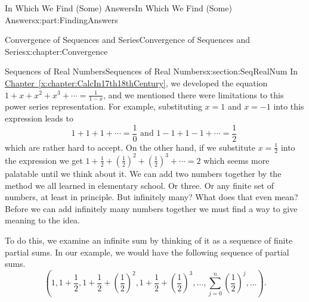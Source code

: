 \typeout{************************************************}
\typeout{************************************************}
%
\begin{partptx}{In Which We Find (Some) Answers}{}{In Which We Find (Some) Answers}{}{}{x:part:FindingAnswers}
	\typeout{************************************************}
	\typeout{************************************************}
	\begin{chapterptx}{Convergence of Sequences and Series}{}{Convergence of Sequences and Series}{}{}{x:chapter:Convergence}
		\typeout{************************************************}
		\typeout{************************************************}
		\begin{sectionptx}{Sequences of Real Numbers}{}{Sequences of Real Numbers}{}{}{x:section:SeqRealNum}
			In \hyperref[x:chapter:CalcIn17th18thCentury]{Chapter~{\xreffont\ref{x:chapter:CalcIn17th18thCentury}}}, we developed the equation \(1+x+x^2+x^3+\cdots=\frac{1}{1-x}\), and we mentioned there were limitations to this power series representation.  For example, substituting \(x=1\) and \(x=-1\) into this expression leads to%
			\begin{equation*}
				1+1+1+\cdots=\frac{1}{0} \text{ and }  1-1+1-1+\cdots=\frac{1}{2}\
			\end{equation*}
			which are rather hard to accept.  On the other hand, if we substitute \(x=\frac{1}{2}\) into the expression we get \(1+\frac{1}{2}+\left(\frac{1}{2}\right)^2+\left(\frac{1}{2}\right)^3+\cdots=2\) which seems more palatable until we think about it.  We can add two numbers together by the method we all learned in elementary school.  Or three.  Or any finite set of numbers, at least in principle.  But infinitely many?  What does that even mean? Before we can add infinitely many numbers together we must find a way to give meaning to the idea.%
			\par
			To do this, we examine an infinite sum by thinking of it as a sequence of finite partial sums. In our example, we would have the following sequence of partial sums.%
			\begin{equation*}
				\left(1,1+\frac{1}{2},1+\frac{1}{2}+\left(\frac{1}{2}\right)^2,1+ \frac{1}{2}+\left(\frac{1}{2}\right)^3,\ldots,\sum_{j=0}^n\left(\frac{1}{2} \right)^j,\ldots\right)\text{.}
			\end{equation*}
			\par

\end{sectionptx}
\end{chapterptx}
\end{partptx}
